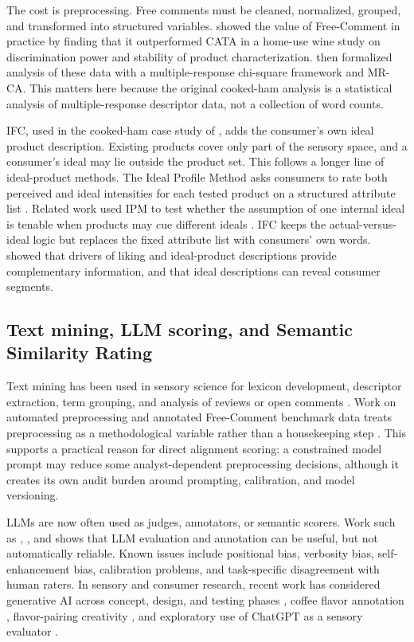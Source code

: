 \documentclass[12pt]{article}
\begin{document}
The cost is preprocessing. Free comments must be cleaned, normalized, grouped, and transformed into structured variables. \citet{mahieu2020fcwine} showed the value of Free-Comment in practice by finding that it outperformed CATA in a home-use wine study on discrimination power and stability of product characterization. \citet{mahieu2021mrca} then formalized analysis of these data with a multiple-response chi-square framework and MR-CA. This matters here because the original cooked-ham analysis is a statistical analysis of multiple-response descriptor data, not a collection of word counts.

IFC, used in the cooked-ham case study of \citet{mahieu2022ifc}, adds the consumer's own ideal product description. Existing products cover only part of the sensory space, and a consumer's ideal may lie outside the product set. This follows a longer line of ideal-product methods. The Ideal Profile Method asks consumers to rate both perceived and ideal intensities for each tested product on a structured attribute list \citep{worch2013ipm}. Related work used IPM to test whether the assumption of one internal ideal is tenable when products may cue different ideals \citep{worchennis2013singleideal}. IFC keeps the actual-versus-ideal logic but replaces the fixed attribute list with consumers' own words. \citet{mahieu2022ifc} showed that drivers of liking and ideal-product descriptions provide complementary information, and that ideal descriptions can reveal consumer segments.

\subsection{Text mining, LLM scoring, and Semantic Similarity Rating}

Text mining has been used in sensory science for lexicon development, descriptor extraction, term grouping, and analysis of reviews or open comments \citep{hamilton2020nlp,miller2021whisky,hamilton2025review}. Work on automated preprocessing and annotated Free-Comment benchmark data treats preprocessing as a methodological variable rather than a housekeeping step \citep{visallimahieu2023preprocessing,visalli2024madeleines}. This supports a practical reason for direct alignment scoring: a constrained model prompt may reduce some analyst-dependent preprocessing decisions, although it creates its own audit burden around prompting, calibration, and model versioning.

LLMs are now often used as judges, annotators, or semantic scorers. Work such as \citet{zheng2023judge}, \citet{liu2023geval}, and \citet{gilardi2023chatgpt} shows that LLM evaluation and annotation can be useful, but not automatically reliable. Known issues include positional bias, verbosity bias, self-enhancement bias, calibration problems, and task-specific disagreement with human raters. In sensory and consumer research, recent work has considered generative AI across concept, design, and testing phases \citep{motoki2025genai}, coffee flavor annotation \citep{jakkaew2026coffee}, flavor-pairing creativity \citep{wang2025flavor}, and exploratory use of ChatGPT as a sensory evaluator \citep{torrico2025chatgpt}.
\end{document}
